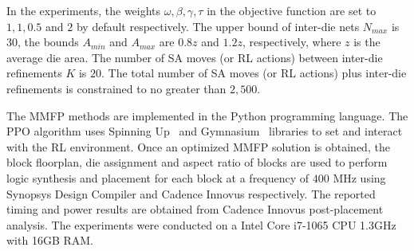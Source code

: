 In the experiments, the weights $\omega, \beta, \gamma, \tau$ in the objective function are set to $1, 1, 0.5$ and $2$ by default respectively.
The upper bound of inter-die nets $N_{max}$ is $30$, the bounds $A_{min}$ and $A_{max}$ are $0.8z$ and $1.2z$, respectively, where $z$ is the average die area. The number of SA moves (or RL actions) between inter-die refinements $K$ is $20$.
The total number of SA moves (or RL actions) plus inter-die refinements is constrained to no greater than $2,500$. 

The MMFP methods are implemented in the Python programming language. The PPO algorithm uses Spinning Up~\cite{achiam2018spinningup} and Gymnasium~\cite{towers2024gymnasium} libraries to set and interact with the RL environment. Once an optimized MMFP solution is obtained, the block floorplan, die assignment and aspect ratio of blocks are used to perform logic synthesis and placement for each block at a frequency of $400$ MHz using Synopsys Design Compiler and Cadence Innovus respectively. 
The reported timing and power results are obtained from Cadence Innovus post-placement analysis.
The experiments were conducted on a Intel Core i7-1065 CPU 1.3GHz with 16GB RAM.